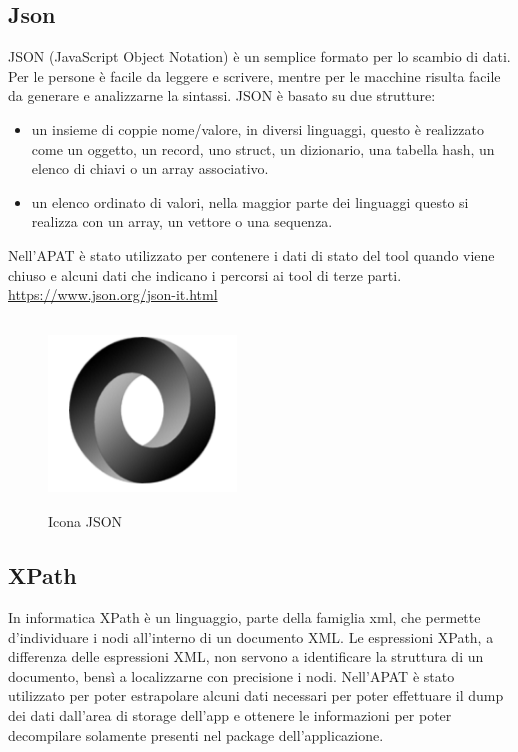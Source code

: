 \subsection*{Json}
JSON (JavaScript Object Notation) è un semplice formato per lo scambio di dati.
Per le persone è facile da leggere e scrivere, mentre per le macchine risulta facile da generare e analizzarne la sintassi.
JSON è basato su due strutture:
\begin{itemize}
    \item un insieme di coppie nome/valore, in diversi linguaggi, questo è realizzato come un oggetto, un record, uno struct, un dizionario, una tabella hash, un elenco di chiavi o un array associativo.
    \item un elenco ordinato di valori, nella maggior parte dei linguaggi questo si realizza con un array, un vettore o una sequenza.
\end{itemize}
Nell'APAT è stato utilizzato per contenere i dati di stato del tool quando viene chiuso e alcuni dati che indicano i percorsi ai tool di terze parti.
\url{https://www.json.org/json-it.html}
\begin{figure}[H]
    \centering
    \includegraphics[width=5cm, height=5cm]{./immagini/json.png}
    \caption{Icona JSON}\label{fig:json}
\end{figure}

\subsection*{XPath}\label{subsec:xpath}
In informatica XPath è un linguaggio, parte della famiglia \gls{xml}, che permette d'individuare i nodi all'interno di un documento XML. Le espressioni XPath, a differenza delle espressioni XML, non servono a identificare la struttura di un documento, bensì a localizzarne con precisione i nodi.
Nell'APAT è stato utilizzato per poter estrapolare alcuni dati necessari per poter effettuare il dump dei dati dall'area di storage dell'app e ottenere le informazioni per poter decompilare solamente presenti nel package dell'applicazione.


